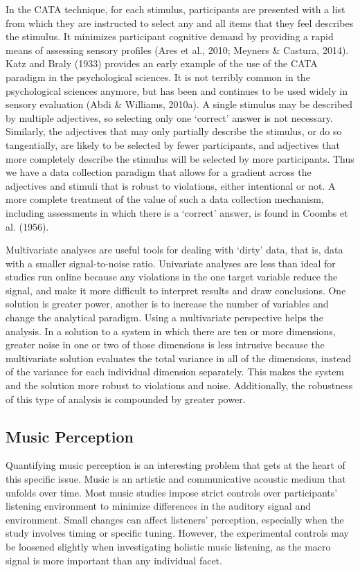 \documentclass[
  english,
  man,floatsintext]{apa6}
\begin{document}
In the CATA technique, for each stimulus, participants are presented with a list from which they are instructed to select any and all items that they feel describes the stimulus. It minimizes participant cognitive demand by providing a rapid means of assessing sensory profiles (Ares et al., 2010; Meyners \& Castura, 2014). Katz and Braly (1933) provides an early example of the use of the CATA paradigm in the psychological sciences. It is not terribly common in the psychological sciences anymore, but has been and continues to be used widely in sensory evaluation (Abdi \& Williams, 2010a). A single stimulus may be described by multiple adjectives, so selecting only one `correct' answer is not necessary. Similarly, the adjectives that may only partially describe the stimulus, or do so tangentially, are likely to be selected by fewer participants, and adjectives that more completely describe the stimulus will be selected by more participants. Thus we have a data collection paradigm that allows for a gradient across the adjectives and stimuli that is robust to violations, either intentional or not. A more complete treatment of the value of such a data collection mechanism, including assessments in which there is a `correct' answer, is found in Coombs et al. (1956).

Multivariate analyses are useful tools for dealing with `dirty' data, that is, data with a smaller signal-to-noise ratio. Univariate analyses are less than ideal for studies run online because any violations in the one target variable reduce the signal, and make it more difficult to interpret results and draw conclusions. One solution is greater power, another is to increase the number of variables and change the analytical paradigm. Using a multivariate perspective helps the analysis. In a solution to a system in which there are ten or more dimensions, greater noise in one or two of those dimensions is less intrusive because the multivariate solution evaluates the total variance in all of the dimensions, instead of the variance for each individual dimension separately. This makes the system and the solution more robust to violations and noise. Additionally, the robustness of this type of analysis is compounded by greater power.

\hypertarget{music-perception}{%
\subsection{Music Perception}\label{music-perception}}

Quantifying music perception is an interesting problem that gets at the heart of this specific issue. Music is an artistic and communicative acoustic medium that unfolds over time. Most music studies impose strict controls over participants' listening environment to minimize differences in the auditory signal and environment. Small changes can affect listeners' perception, especially when the study involves timing or specific tuning. However, the experimental controls may be loosened slightly when investigating holistic music listening, as the macro signal is more important than any individual facet.
\end{document}
